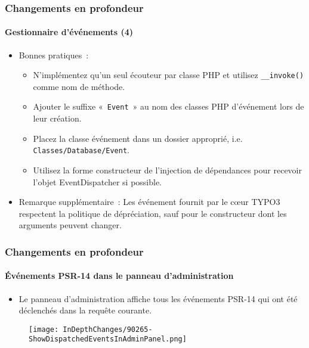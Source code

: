 
\begin{frame}[fragile]
	\frametitle{Changements en profondeur}
	\framesubtitle{Gestionnaire d'événements (4)}

	\lstset{basicstyle=\tiny\ttfamily}

	\begin{itemize}
		\item Bonnes pratiques~:

			\begin{itemize}
				\item N'implémentez qu'un seul écouteur par classe PHP et utilisez \texttt{\_\_invoke()}
					comme nom de méthode.
				\item Ajouter le suffixe «~\texttt{Event}~» au nom des classes PHP d'événement
					lors de leur création.
				\item Placez la classe événement dans un dossier approprié, i.e. \texttt{Classes/Database/Event}.
				\item Utilisez la forme constructeur de l'injection de dépendances pour recevoir
					l'objet EventDispatcher si possible.
			\end{itemize}

		\item Remarque supplémentaire~:\newline
			\small
				Les événement fournit par le cœur TYPO3 respectent la politique de dépréciation,
				sauf pour le constructeur dont les arguments peuvent changer.
			\normalsize

	\end{itemize}

\end{frame}


\begin{frame}[fragile]
	\frametitle{Changements en profondeur}
	\framesubtitle{Événements PSR-14 dans le panneau d'administration}

	\begin{itemize}
		\item Le panneau d'administration affiche tous les événements PSR-14
			qui ont été déclenchés dans la requête courante.
	\end{itemize}

	\begin{figure}
		\texttt{[image: InDepthChanges/90265-ShowDispatchedEventsInAdminPanel.png]}
	\end{figure}

\end{frame}

